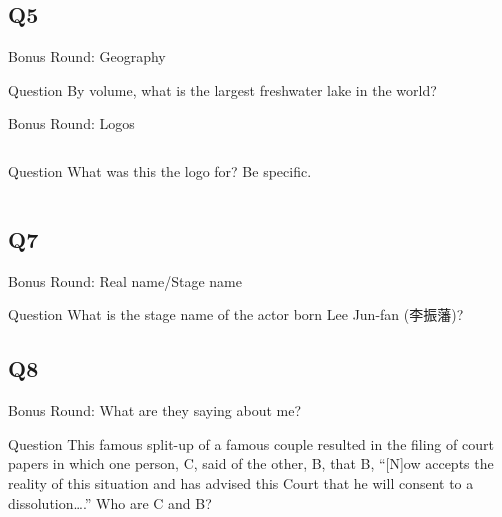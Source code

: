 \documentclass[11pt]{beamer}
\begin{document}
\subsection*{Q5}
\begin{frame}[t]{Bonus Round: Geography}
\begin{block}{Question}
By volume, what is the largest freshwater lake in the world?
\end{block}
\end{frame}
\begin{frame}[t]{Bonus Round: Logos}
\begin{columns}[T,totalwidth=\linewidth]
\begin{column}{0.47\linewidth}
\begin{block}{Question}
What was this the logo for? Be specific.
\end{block}
\end{column}
\begin{column}{0.47\linewidth}
\texttt{[image: \{Images/paris2024bid]}.png}
\end{column}
\end{columns}
\end{frame}
\subsection*{Q7}
\begin{frame}[t]{Bonus Round: Real name/Stage name}
\begin{block}{Question}
What is the stage name of the actor born Lee Jun-fan (李振藩)?
\end{block}
\end{frame}
\subsection*{Q8}
\begin{frame}[t]{Bonus Round: What are they saying about me?}
\begin{block}{Question}
This famous split-up of a famous couple resulted in the filing of court papers in which one person, C\textunderscore{}\textunderscore{}\textunderscore{}\textunderscore{}\textunderscore{}, said of the other, B\textunderscore{}\textunderscore{}\textunderscore{}\textunderscore{}\textunderscore{}, that B\textunderscore{}\textunderscore{}\textunderscore{}\textunderscore{}\textunderscore{}, ``[N]ow accepts the reality of this situation and has advised this Court that he will consent to a dissolution\ldots{}.'' Who are C\textunderscore{}\textunderscore{}\textunderscore{}\textunderscore{}\textunderscore{} and B\textunderscore{}\textunderscore{}\textunderscore{}\textunderscore{}\textunderscore{}?
\end{block}
\end{frame}
\end{document}
